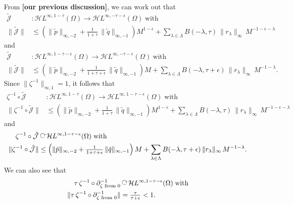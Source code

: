 \documentclass{article}
\theoremstyle{definition}
\newcommand{\maps}{\colon}
\newcommand{\acts}{\mathbin{\raisebox{\depth}{\rotatebox{-90}{$\circlearrowright$}}}}
\newcommand{\holoL}[1]{\mathcal{H}L^{#1}} %
\begin{document}
From \textbf{[our previous discussion]}, we can work out that
\begin{align*}
\tilde{\mathcal{J}} & \maps \holoL{\infty, 1-\tau}(\Omega) \to \holoL{\infty, -\tau-\epsilon}(\Omega)\;\text{with} \\
\|\tilde{\mathcal{J}}\| & \le \left(\|\tilde{p}\|_{\infty, -2} + \tfrac{1}{1+\tau}\,\|\tilde{q}\|_{\infty, -1} \right) M^{1-\epsilon} + \sum_{\lambda \in \Lambda} B(-\lambda, \tau)\,\|r_\lambda\|_{\infty}\,M^{-1-\epsilon-\lambda}
\end{align*}
and
\begin{align*}
\tilde{\mathcal{J}} & \maps \holoL{\infty, 1-\tau-\epsilon}(\Omega) \to \holoL{\infty, -\tau-\epsilon}(\Omega)\;\text{with} \\
\|\tilde{\mathcal{J}}\| & \le \left(\|\tilde{p}\|_{\infty, -2} + \tfrac{1}{1+\tau+\epsilon}\,\|\tilde{q}\|_{\infty, -1} \right) M + \sum_{\lambda \in \Lambda} B(-\lambda, \tau+\epsilon)\,\|r_\lambda\|_{\infty}\,M^{-1-\lambda}.
\end{align*}
Since $\|\zeta^{-1}\|_{\infty, 1} = 1$, it follows that
\begin{align*}
\zeta^{-1} \circ \tilde{\mathcal{J}} & \maps \holoL{\infty, 1-\tau}(\Omega) \to \holoL{\infty, 1-\tau-\epsilon}(\Omega)\;\text{with} \\
\|\zeta^{-1} \circ \tilde{\mathcal{J}}\| & \le \left(\|\tilde{p}\|_{\infty, -2} + \tfrac{1}{1+\tau}\,\|\tilde{q}\|_{\infty, -1} \right) M^{1-\epsilon} + \sum_{\lambda \in \Lambda} B(-\lambda, \tau)\,\|r_\lambda\|_{\infty}\,M^{-1-\epsilon-\lambda} \label{bound:mollify}
\end{align*}
and
\begin{align}
\zeta^{-1} \circ \tilde{\mathcal{J}} & \acts \holoL{\infty, 1-\tau-\epsilon}(\Omega)\;\text{with} \\%
\|\zeta^{-1} \circ \tilde{\mathcal{J}}\| & \le \left(\|\tilde{p}\|_{\infty, -2} + \tfrac{1}{1+\tau+\epsilon}\,\|\tilde{q}\|_{\infty, -1} \right) M + \sum_{\lambda \in \Lambda} B(-\lambda, \tau+\epsilon)\,\|r_\lambda\|_{\infty}\,M^{-1-\lambda}. \label{bound:perturb}
\end{align}
We can also see that
\begin{align}
\tau\,\zeta^{-1} \circ \partial^{-1}_{\zeta \text{ from } 0} & \acts \holoL{\infty, 1-\tau-\epsilon}(\Omega)\;\text{with}   \nonumber \\
\|\tau\,\zeta^{-1} \circ \partial^{-1}_{\zeta \text{ from } 0}\| & = \tfrac{\tau}{\tau+\epsilon} < 1 \label{bound:contract}.
\end{align}
\end{document}
